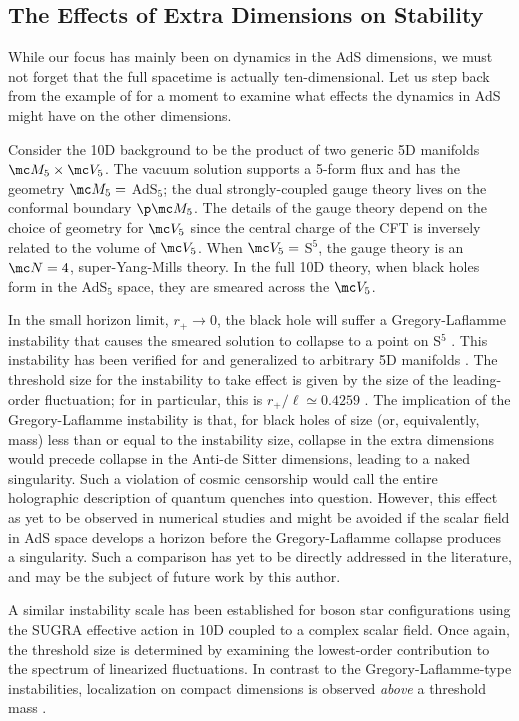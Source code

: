 \subsection{The Effects of Extra Dimensions on Stability}
\label{sub: extra dims on stability}

While our focus has mainly been on dynamics in the AdS dimensions, we must not forget that the full spacetime is actually ten-dimensional. Let us step back from the example of \ads for a moment to examine what effects the dynamics in AdS might have on the other dimensions.

Consider the 10D background to be the product of two generic 5D manifolds $\mc M_5 \times \mc V_5$. The vacuum solution supports a 5-form flux and has the geometry $\mc M_5 =$ AdS$_5$; the dual strongly-coupled gauge theory lives on the conformal boundary $\p \mc M_5$. The details of the gauge theory depend on the choice of geometry for $\mc V_5$ since the central charge of the CFT is inversely related to the volume of $\mc V_5$. When $\mc V_5 =$ S$^5$, the gauge theory is an $\mc N = 4$, super-Yang-Mills theory. In the full 10D theory, when black holes form in the AdS$_5$ space, they are smeared across the $\mc V_5$. 

In the small horizon limit, $r_+ \to 0$, the black hole will suffer a Gregory-Laflamme instability that causes the smeared solution to collapse to a point on S$^5$ \cite{hep-th/9301052}. This instability has been verified for \ads and generalized to arbitrary 5D manifolds \cite{1509.07780}. The threshold size for the instability to take effect is given by the size of the leading-order fluctuation; for \ads in particular, this is $r_+ / \ell \simeq 0.4259$ \cite{1502.01574}. The implication of the Gregory-Laflamme instability is that, for black holes of size (or, equivalently, mass) less than or equal to the instability size, collapse in the extra dimensions would precede collapse in the Anti-de Sitter dimensions, leading to a naked singularity. Such a violation of cosmic censorship would call the entire holographic description of quantum quenches into question. However, this effect as yet to be observed in numerical studies and might be avoided if the scalar field in AdS space develops a horizon before the Gregory-Laflamme collapse produces a singularity. Such a comparison has yet to be directly addressed in the literature, and may be the subject of future work by this author.

A similar instability scale has been established for boson star configurations using the SUGRA effective action in 10D coupled to a complex scalar field. Once again, the threshold size is determined by examining the lowest-order contribution to the spectrum of linearized fluctuations. In contrast to the Gregory-Laflamme-type instabilities, localization on compact dimensions is observed \emph{above} a threshold mass \cite{1509.00774}.

